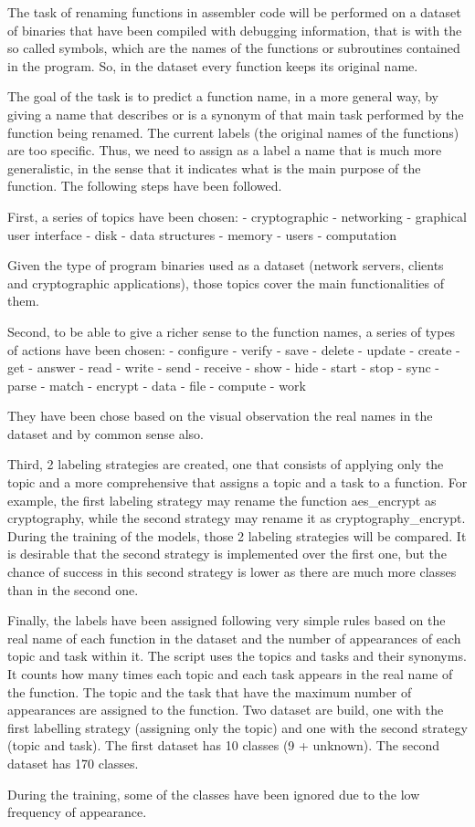 \begin{appendices}
The task of renaming functions in assembler code will be performed on a dataset of binaries that have been compiled with debugging information, that is with the so called symbols, which are the names of the functions or subroutines contained in the program. So, in the dataset every function keeps its original name.


The goal of the task is to predict a function name, in a more general way, by giving a name that describes or is a synonym of that main task performed by the function being renamed.  The current labels (the original names of the functions) are too specific. Thus, we need to assign as a label a name that is much more generalistic, in the sense that it indicates what is the main purpose of the function. The following steps have been followed.

First, a series of topics have been chosen:
- cryptographic
- networking
- graphical user interface
- disk
- data structures
- memory
- users
- computation

Given the type of program binaries used as a dataset (network servers, clients and cryptographic applications), those topics cover the main functionalities of them.

Second, to be able to give a richer sense to the function names, a series of types of actions have been chosen:
- configure 
- verify
- save
- delete
- update
- create 
- get 
- answer
- read
- write
- send
- receive
- show
- hide
- start
- stop
- sync
- parse
- match
- encrypt
- data
- file
- compute
- work

They have been chose based on the visual observation the real names in the dataset and by common sense also.

Third, 2 labeling strategies are created, one that consists of applying only the topic and a more comprehensive that assigns a topic and a task to a function. For example, the first labeling strategy may rename the function aes_encrypt as cryptography, while the second strategy may rename it as cryptography_encrypt. During the training of the models, those 2 labeling strategies will be compared. It is desirable that the second strategy is implemented over the first one, but the chance of success in this second strategy is lower as there are much more classes than in the second one. 

Finally, the labels have been assigned following very simple rules based on the real name of each function in the dataset and the number of appearances of each topic and task within it. The script uses the topics and tasks and their synonyms. It counts how many times each topic and each task appears in the real name of the function. The topic and the task that have the maximum number of appearances are assigned to the function. Two dataset are build, one with the first labelling strategy (assigning only the topic) and one with the second strategy (topic and task). The first dataset has 10 classes (9 + unknown). The second dataset has 170 classes. 

During the training, some of the classes have been ignored due to the low frequency of appearance.


\end{appendices} 